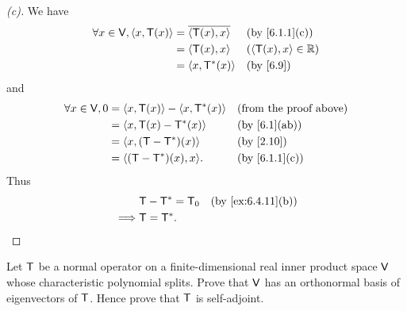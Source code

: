 \begin{proof}[(c)]
	We have
	\begin{align*}
		\forall x \in \V, \inn{x, \T(x)} & = \conj{\inn{\T(x), x}} &  & \by{6.1.1}[c]           \\
		                                 & = \inn{\T(x), x}        &  & (\inn{\T(x), x} \in \R) \\
		                                 & = \inn{x, \T^*(x)}      &  & \by{6.9}
	\end{align*}
	and
	\begin{align*}
		\forall x \in \V, 0 & = \inn{x, \T(x)} - \inn{x, \T^*(x)} &  & \text{(from the proof above)} \\
		                    & = \inn{x, \T(x) - \T^*(x)}          &  & \by{6.1}[ab]                  \\
		                    & = \inn{x, (\T - \T^*)(x)}           &  & \by{2.10}                     \\
		                    & = \inn{(\T - \T^*)(x), x}.          &  & \by{6.1.1}[c]
	\end{align*}
	Thus
	\begin{align*}
		         & \T - \T^* = \zT &  & \by{ex:6.4.11}[b] \\
		\implies & \T = \T^*.
	\end{align*}
\end{proof}

\begin{ex}\label{ex:6.4.12}
	Let \(\mathsf{T}\) be a normal operator on a finite-dimensional real inner product space \(\mathsf{V}\) whose characteristic polynomial splits.
	Prove that \(\mathsf{V}\) has an orthonormal basis of eigenvectors of \(\mathsf{T}\).
	Hence prove that \(\mathsf{T}\) is self-adjoint.
\end{ex}

